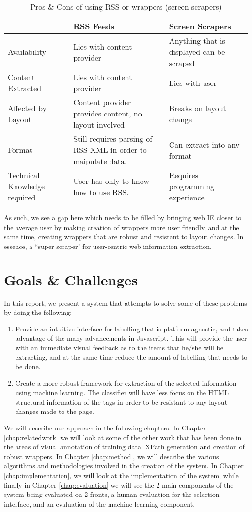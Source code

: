 \begin{table}[t]
\centering
\singlespacing
\small
\begin{tabular}{|p{3cm}|p{5cm}|p{5cm}|}
\hline
					&	RSS Feeds	&	Screen Scrapers \\
\hline
\hline
	Availability	&
	Lies with content provider &
	Anything that is displayed can be scraped \\
\hline
	Content Extracted &
	Lies with content provider &
	Lies with user \\
\hline
	Affected by Layout &
	Content provider provides content, no layout involved &
	Breaks on layout change \\
\hline
	Format &
	Still requires parsing of RSS XML in order to maipulate data. &
	Can extract into any format \\
\hline
	Technical Knowledge required &
	User has only to know how to use RSS. &
	Requires programming experience \\
	\hline
\end{tabular}
\caption{Pros \& Cons of using RSS or wrappers (screen-scrapers)}
\label{tab:template}
\end{table}

As such, we see a gap here which needs to be filled by bringing web IE closer to the average
user by making creation of wrappers more user friendly, and at the same time, creating wrappers
that are robust and resistant to layout changes. In essence, a ``super scraper" for
user-centric web information extraction.

\section{Goals \& Challenges}
In this report, we present a system that attempts to solve some of these problems by doing the
following:
	\begin{enumerate}
		\item Provide an intuitive interface for labelling that is platform agnostic, and takes
		 advantage of the many advancements in Javascript. This will provide the user with an
		 immediate visual feedback as to the items that he/she will be extracting, and at the
		 same time reduce the amount of labelling that needs to be done.
		\item Create a more robust framework for extraction of the selected information using
		machine learning. The classifier will have less focus on the HTML structural
		information of the tags in order to be resistant to any layout changes made to the page.
	\end{enumerate}

We will describe our approach in the following chapters. In Chapter \ref{chap:relatedwork} we
will look at some of the other work that has been done in the areas of visual annotation of
training data, XPath generation and creation of robust wrappers. In Chapter \ref{chap:method},
we will describe the various algorithms and methodologies involved in the creation of the
system. In Chapter \ref{chap:implementation}, we will look at the implementation of the system,
while finally in Chapter \ref{chap:evaluation} we will see the 2 main components of the system
being evaluated on 2 fronts, a human evaluation for the selection interface, and an evaluation
of the machine learning component.